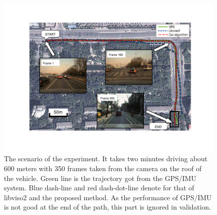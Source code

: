\documentclass[letterpaper, 10 pt, conference]{ieeeconf}  %
\begin{document}
\begin{figure}[t]
\centering
\includegraphics[width=0.9\linewidth]{source//Final//senario.pdf}
\caption{The scenario of the experiment. It takes two minutes driving about 600 meters with 350 frames taken from the camera on the roof of the vehicle. Green line is the trajectory got from the GPS/IMU system. Blue dash-line and red dash-dot-line denote for that of libviso2 and the proposed method. As the performance of GPS/IMU is not good at the end of the path, this part is ignored in validation.}
\label{fig:scenario}
\end{figure}
\end{document}
